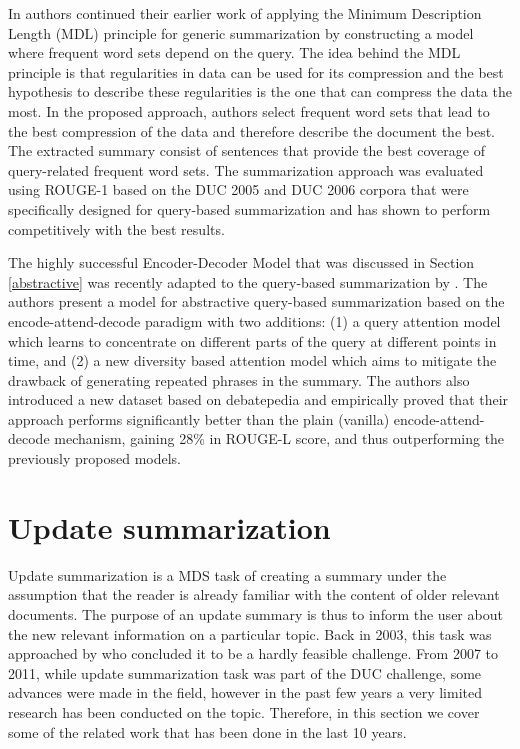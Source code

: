 \documentclass[11pt,a4paper,onecolumn]{article}
\begin{document}
In \cite{litvak2017query} authors continued their earlier work \cite{litvak2015krimping} of applying the Minimum Description Length (MDL) principle for generic summarization by constructing a model where frequent word sets depend on the query.
The idea behind the MDL principle is that regularities in data can be used for its compression and the best hypothesis to describe these regularities is the one that can compress the data the most.
In the proposed approach, authors select frequent word sets that lead to the best compression of the data and therefore describe the document the best.
The extracted summary consist of sentences that provide the best coverage of query-related frequent word sets.
The summarization approach was evaluated using ROUGE-1 based on the DUC 2005 and DUC 2006 corpora that were specifically designed for query-based summarization and has shown to perform competitively with the best results.

The highly successful Encoder-Decoder Model that was discussed in Section \ref{abstractive} was recently adapted to the query-based summarization by .
The authors present a model for abstractive query-based summarization based on the encode-attend-decode paradigm with two additions: (1) a query attention model which learns to concentrate on different parts of the query at different points in time, and (2) a new diversity based attention model which aims to mitigate the drawback of generating repeated phrases in the summary.
The authors also introduced a new dataset based on debatepedia and empirically proved that their approach performs significantly better than the plain (vanilla) encode-attend-decode mechanism, gaining 28\% in ROUGE-L score, and thus outperforming the previously proposed models.

\section{Update summarization}
Update summarization is a MDS task of creating a summary under the assumption that the reader is already familiar with the content of older relevant documents.
The purpose of an update summary is thus to inform the user about the new relevant information on a particular topic.
Back in 2003, this task was approached by  who concluded it to be a hardly feasible challenge.
From 2007 to 2011, while update summarization task was part of the DUC challenge, some advances were made in the field, however in the past few years a very limited research has been conducted on the topic.
Therefore, in this section we cover some of the related work that has been done in the last 10 years.
\end{document}
